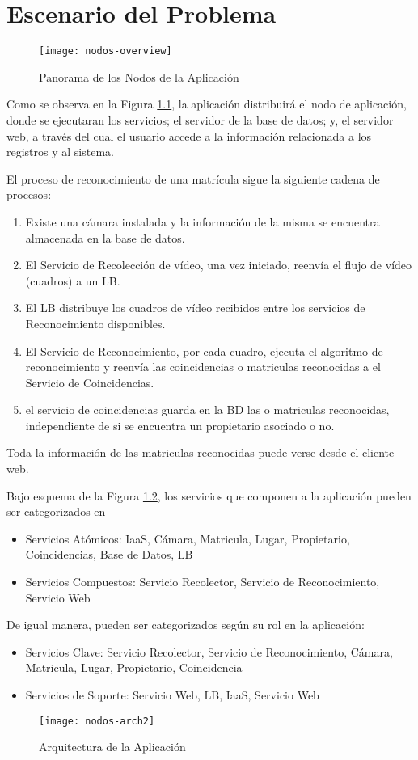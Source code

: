 \chapter{Escenario del Problema}
\begin{figure}[H]
\centering
\texttt{[image: nodos-overview]}
\caption{Panorama de los Nodos de la Aplicación}
\label{fig:nodos-overview}
\end{figure}
    
    Como se observa en la Figura \ref{fig:nodos-overview}, la aplicación distribuirá el nodo de aplicación, donde se ejecutaran los servicios; el servidor de la base de datos; y, el servidor web, a través del cual el usuario accede a la información relacionada a los registros y al sistema.
        
    El proceso de reconocimiento de una matrícula sigue la siguiente cadena de procesos:

        \begin{enumerate}
            \item Existe una cámara instalada y la información de la misma se encuentra almacenada en la base de datos.
            \item El Servicio de Recolección de vídeo, una vez iniciado, reenvía el flujo de vídeo (cuadros) a un LB.
            \item El LB distribuye los cuadros de vídeo recibidos entre los servicios de Reconocimiento disponibles.
            \item El Servicio de Reconocimiento, por cada cuadro, ejecuta el algoritmo de reconocimiento y reenvía las coincidencias o matriculas reconocidas a el Servicio de Coincidencias.
            \item el servicio de coincidencias guarda en la BD las  o matriculas reconocidas, independiente de si se encuentra un propietario asociado o no.
        \end{enumerate}    
        
Toda la información de las matriculas reconocidas puede verse desde el cliente web.

Bajo esquema de la Figura \ref{fig:nodos-arch}, los servicios que componen a la aplicación pueden ser categorizados en

    \begin{itemize}
        \item Servicios Atómicos: IaaS, Cámara, Matricula, Lugar, Propietario, Coincidencias, Base de Datos, LB
        \item Servicios Compuestos: Servicio Recolector, Servicio de Reconocimiento, Servicio Web
    \end{itemize}
    De igual manera, pueden ser categorizados según su rol en la aplicación:
    \begin{itemize}
        \item Servicios Clave: Servicio Recolector, Servicio de Reconocimiento, Cámara, Matricula, Lugar, Propietario, Coincidencia
        \item Servicios de Soporte: Servicio Web, LB, IaaS, Servicio Web
    \end{itemize}

\begin{figure}[ht]
\centering
\texttt{[image: nodos-arch2]}
\caption{Arquitectura de la Aplicación}
\label{fig:nodos-arch}
\end{figure} 